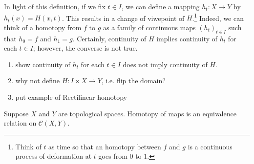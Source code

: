 
In light of this definition, if we fix \(t\in I\),  we can define a mapping \(h_t \colon X\to Y\) by \(h_t(x) = H(x,t)\). This results in a change of viwepoint of \(H\).\footnote{Think of \(t\) as time so that an homotopy between \(f\) and \(g\) is a continuous process of deformation at  \(t\) goes from \(0\) to \(1\).} Indeed, we can think of a homotopy from \(f\) to \(g\) as a family of continuous maps \(\left( h_t \right)_{t\in I}\) such that \(h_0 = f\) and \(h_1 = g\). Certainly,  continuity of \(H\) implies continuity of \(h_t\) for each \(t\in I\); however, the converse is not true.




    

\begin{example}
\begin{enumerate}[label=(\alph*)]
    \item show continuity of \(h_t\) for each \(t\in I\) does not imply continuity of \(H\). 
    \item why not define \(H:I\times X\to Y\), i.e. flip the domain?
    \item put example of Rectilinear homotopy
\end{enumerate}
\end{example}


\begin{theorem}\label{homotopy.is.eq.relation}
    Suppose \(X\)  and \(Y\) are topological spaces. 
    Homotopy of maps is an equivalence relation on \(\mathcal{C}(X,Y)\).
\end{theorem}

